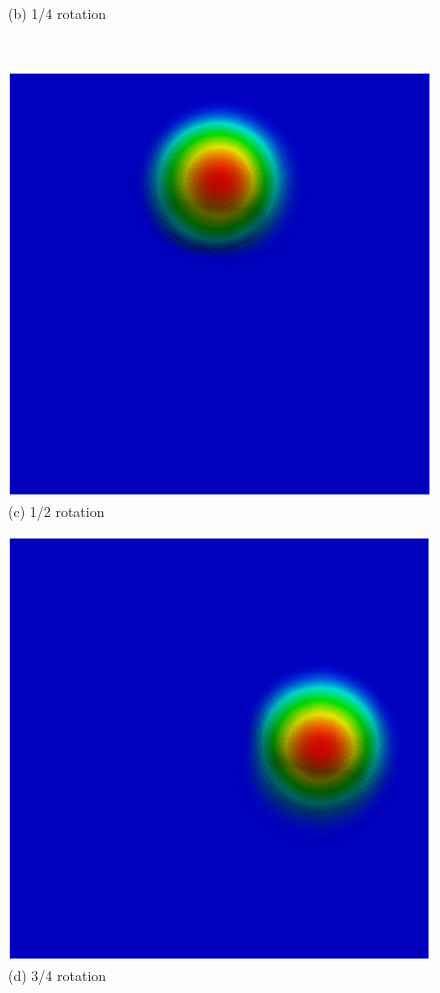 \begin{figure}[H]
\begin{minipage}{.5\linewidth}
      (b) 1/4 rotation
     \end{minipage}\\[10pt]
     \begin{minipage}{.5\linewidth}
      \centering
      \includegraphics[scale=0.42]{./02_chaps/cap_validation/figure/figSLquad2.png}\\
      (c) 1/2 rotation
     \end{minipage}%
     \begin{minipage}{.5\linewidth}
      \centering
      \includegraphics[scale=0.42]{./02_chaps/cap_validation/figure/figSLquad3.png}\\
      (d) 3/4 rotation
     \end{minipage}
     \label{SL quad fig}
\end{figure}

